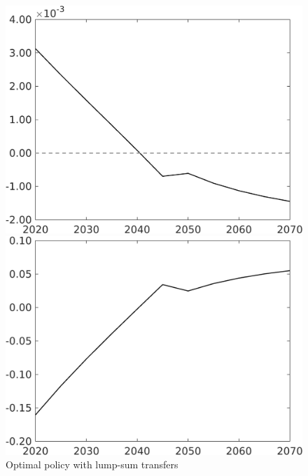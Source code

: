 \begin{figure}[h!!!]
	\centering
	\caption{Optimal policy with lump-sum transfers}\label{fig:opt_TLs}
	\begin{minipage}[]{0.32\textwidth}
	\includegraphics[width=1\textwidth]{../../codding_model/own_basedOnFried/optimalPol_010922_revision/figures/all_13Sept22_Tplus30/taul_OPT_COMPtaul_regime4_spillover0_knspil0_noskill0_sep0_xgrowth0_PV1_etaa0.79_lgd0.png}
\end{minipage}
\begin{minipage}[]{0.32\textwidth}
\includegraphics[width=1\textwidth]{../../codding_model/own_basedOnFried/optimalPol_010922_revision/figures/all_13Sept22_Tplus30/tauf_OPT_COMPtaulPer_regime4_spillover0_knspil0_noskill0_sep0_xgrowth0_PV1_etaa0.79.png}

\end{minipage}
\end{figure}
